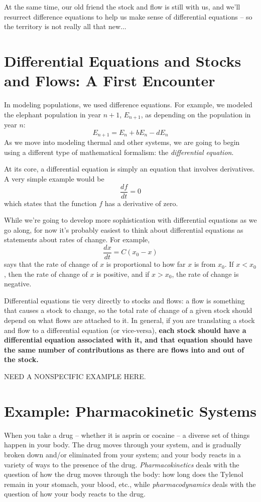 \documentclass[10pt]{book}
\begin{document}
At the same time, our old friend the stock and flow is still with us, and we'll resurrect difference equations to help us make sense of differential equations -- so the territory is not really all that new...

\section{Differential Equations and Stocks and Flows: A First Encounter}

In modeling populations, we used difference equations.  For example, we modeled the elephant population in year $n+1$, $E_{n+1}$, as depending on the population in year $n$:
$$E_{n+1} = E_n + bE_n - d E_n$$
As we move into modeling thermal and other systems, we are going to begin using a different type of mathematical formalism:  the {\it differential equation}.

At its core, a differential equation is simply an equation that involves derivatives.  A very simple example would be
$$\frac{df}{dt} = 0$$
which states that the function $f$ has a derivative of zero.

While we're going to develop more sophistication with differential equations as we go along, for now it's probably easiest to think about differential equations as statements about rates of change.  For example, 
$$\frac{dx}{dt} = C(x_0-x)$$
says that the rate of change of  $x$ is proportional to how far $x$ is from $x_0$.  If $x<x_0$, then the rate of change of $x$ is positive, and if $x>x_0$, the rate of change is negative.  

Differential equations tie very directly to stocks and flows:  a flow is something that causes a stock to change, so the total rate of change of a given stock should depend on what flows are attached to it.  In general, if you are translating a stock and flow to a differential equation (or vice-versa), 
{\bf each stock should have a differential equation associated with it, and that equation should have the same number of contributions as there are flows into and out of the stock.}   

NEED A NONSPECIFIC EXAMPLE HERE.

\section{Example: Pharmacokinetic Systems}

When you take a drug -- whether it is asprin or cocaine -- a diverse set of things happen in your body.  The drug moves through your system, and is gradually broken down and/or eliminated from your system; and your body reacts in a variety of ways to the presence of the drug.  {\it Pharmacokinetics} deals with the question of how the drug moves through the body:  how long does the Tylenol remain in your stomach, your blood,  etc., while {\it pharmacodynamics} deals with the question of how your body reacts to the  drug.
\end{document}
